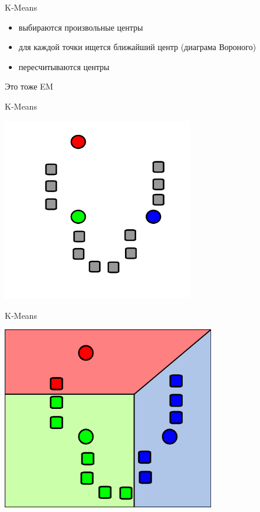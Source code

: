 \documentclass[10pt]{beamer}
\begin{document}
\begin{frame}{K-Means}
  \begin{itemize}
  \item выбираются произвольные центры
  \item для каждой точки ищется ближайший центр (диаграма Вороного)
  \item пересчитываются центры
  \end{itemize}
  Это тоже EM
\end{frame}

\begin{frame}{K-Means}
  \begin{center}
    \includegraphics[height=8cm]{clustering1.png}
  \end{center}
\end{frame}

\begin{frame}{K-Means}
  \begin{center}
    \includegraphics[height=8cm]{clustering2.png}
  \end{center}
\end{frame}
\end{document}

